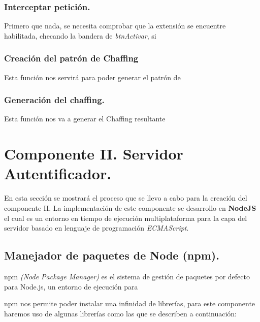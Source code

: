 \documentclass[12pt, a4paper, titlepage]{report}
\begin{document}
            \subsubsection{Interceptar petición.}
            Primero que nada, se necesita comprobar que la extensión se encuentre habilitada, checando la bandera de \textit{btnActivar}, si 
            
            \subsubsection{Creación del patrón de Chaffing}
            Esta función nos servirá para poder generar el patrón de 
            
            \subsubsection{Generación del chaffing.}
	         Esta función nos va a generar el Chaffing resultante 
	         

        	
	\newpage
	
	    \section{Componente II. Servidor Autentificador.}
    	    En esta sección se mostrará el proceso que se llevo a cabo para la creación del componente II. La implementación de este componente se desarrollo en \textbf{NodeJS} el cual es un entorno en tiempo de ejecución multiplataforma para la capa del servidor basado en lenguaje de programación \textit{ECMAScript}. 
    	    
    	    \subsection{Manejador de paquetes de Node (npm).}
    	    npm \textit{(Node Package Manager)} es el sistema de gestión de paquetes por defecto para Node.js, un entorno de ejecución para 
            
            npm nos permite poder instalar una infinidad de librerías, para este componente haremos uso de algunas librerías como las que se describen a continuación:
        
\end{document}
